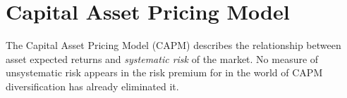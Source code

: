 %
%
%
%

\section{Capital Asset Pricing Model}
\label{sec:capm}

The Capital Asset Pricing Model (CAPM) describes the relationship between asset expected returns and \emph{systematic risk} of the market. No measure of unsystematic risk appears in the risk premium for in the world of CAPM diversification has already eliminated it.

